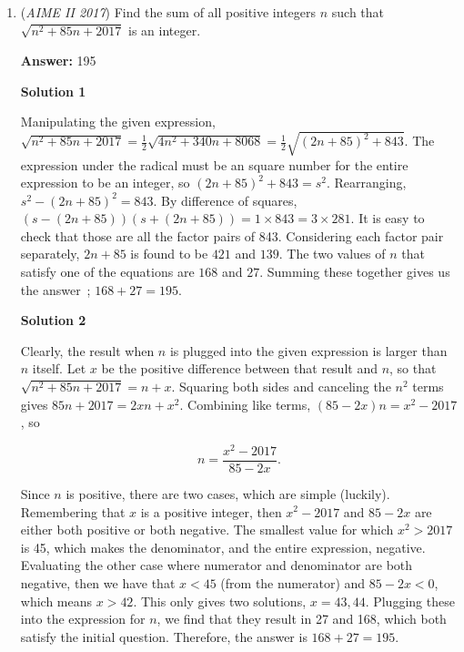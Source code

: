 \begin{enumerate}
 See the first case has our largest $d$, so our answer will be $471+\frac{640}{2} = \boxed{791}$



	\item (\textit{AIME II 2017}) Find the sum of all positive integers $n$ such that $\sqrt{n^2+85n+2017}$ is an integer.


 
 \textbf{Answer: }195



\textbf{Solution 1}

Manipulating the given expression, $\sqrt{n^2+85n+2017}=\frac{1}{2}\sqrt{4n^2+340n+8068}=\frac{1}{2}\sqrt{(2n+85)^2+843}$. The expression under the radical must be an square number for the entire expression to be an integer, so $(2n+85)^2+843=s^2$. Rearranging, $s^2-(2n+85)^2=843$. By difference of squares, $(s-(2n+85))(s+(2n+85))=1\times843=3\times281$. It is easy to check that those are all the factor pairs of 843. Considering each factor pair separately, $2n+85$ is found to be $421$ and $139$. The two values of $n$ that satisfy one of the equations are $168$ and $27$. Summing these together gives us the answer ; $168+27=\boxed{195}$.

 



\textbf{Solution 2}

Clearly, the result when $n$ is plugged into the given expression is larger than $n$ itself. Let $x$ be the positive difference between that result and $n$, so that $\sqrt{n^2+85n+2017}=n+x$. Squaring both sides and canceling the $n^2$ terms gives $85n+2017=2xn+x^2$. Combining like terms, $(85-2x)n=x^2-2017$, so

 
 \[n=\frac{x^2-2017}{85-2x}.\]

 Since $n$ is positive, there are two cases, which are simple (luckily). Remembering that $x$ is a positive integer, then $x^2-2017$ and $85-2x$ are either both positive or both negative. The smallest value for which $x^2>2017$ is 45, which makes the denominator, and the entire expression, negative. Evaluating the other case where numerator and denominator are both negative, then we have that $x<45$ (from the numerator) and $85-2x<0$, which means $x>42$. This only gives two solutions, $x=43, 44$. Plugging these into the expression for $n$, we find that they result in 27 and 168, which both satisfy the initial question. Therefore, the answer is $168+27=\boxed{195}$.

 




\end{enumerate}
